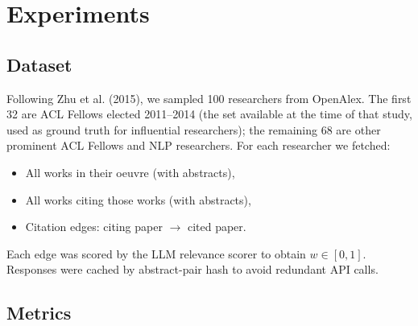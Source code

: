 \section{Experiments}

\subsection{Dataset}

Following Zhu et al. (2015), we sampled 100 researchers from OpenAlex. The first 32 are ACL Fellows elected 2011--2014 (the set available at the time of that study, used as ground truth for influential researchers); the remaining 68 are other prominent ACL Fellows and NLP researchers. For each researcher we fetched:
\begin{itemize}
    \item All works in their oeuvre (with abstracts),
    \item All works citing those works (with abstracts),
    \item Citation edges: citing paper $\to$ cited paper.
\end{itemize}

Each edge was scored by the LLM relevance scorer to obtain $w \in [0,1]$. Responses were cached by abstract-pair hash to avoid redundant API calls.

\subsection{Metrics}

